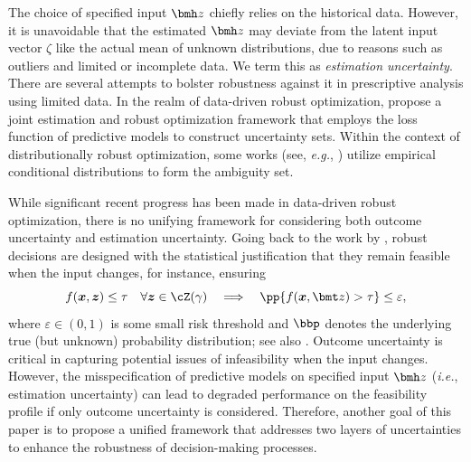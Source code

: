 \documentclass[opre, blindrev]{informs4}
\newcommand{\1}[1]{\mathds{1}{\left(#1\right)}}
\begin{document}
The choice of specified input $\bmh z$ chiefly relies on the historical data. However, it is unavoidable that the estimated $\bmh z$ may deviate from the latent input vector $\zeta$ like the actual mean of unknown distributions, due to reasons such as outliers and limited or incomplete data. We term this as \emph{estimation uncertainty}. There are several attempts to bolster robustness against it in prescriptive analysis using limited data. In the realm of data-driven robust optimization, \cite{Zhu_Xie_Sim_2021joint} propose a joint estimation and robust optimization framework that employs the loss function of predictive models to construct uncertainty sets. 
Within the context of distributionally robust optimization, some works (see, \textit{e.g.}, \citealt{bertsimas2022bootstrap, Esteban_Morales_2021distributionally,Bertsimas_McCord_Sturt_2022dynamic}) utilize empirical conditional distributions to form the ambiguity set. 

While significant recent progress has been made in data-driven robust optimization, there is no unifying framework for considering both outcome uncertainty and estimation uncertainty. Going back to the work by \cite{bertsimas2004price}, robust decisions are designed with the statistical justification that they remain feasible when the input changes, for instance, ensuring 
\[
f(\bm x, \bm z) \leq \tau \quad \forall \bm z \in \cZ(\gamma) ~~~\Longrightarrow~~~
\pp{f(\bm x, \bmt z) > \tau} \leq \varepsilon,
\]
where $\varepsilon \in (0,1)$ is some small risk threshold and $\bbp$ denotes the underlying true (but unknown) probability distribution; see also \cite{bertsimas2021probabilistic}. Outcome uncertainty is critical in capturing potential issues of infeasibility when the input changes.
However, the misspecification of predictive models on specified input $\bmh z$ (\textit{i.e.}, estimation uncertainty) can lead to degraded performance on the feasibility profile if only outcome uncertainty is considered. Therefore, another goal of this paper is to propose a unified framework that addresses two layers of uncertainties to enhance the robustness of decision-making processes.
\end{document}
